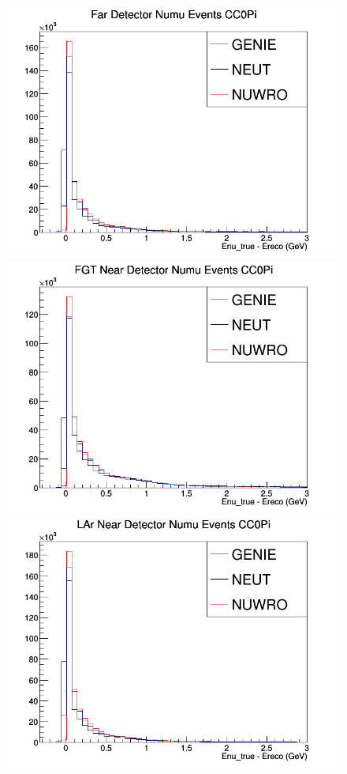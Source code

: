 \documentclass[12pt]{article}
\begin{document}
\begin{figure}[h]
\endminipage
\newline
{}
\includegraphics[width=\linewidth]{Ereco_Etrue/numu_FD_CC0Pi.png}
\endminipage
{}
\includegraphics[width=\linewidth]{Ereco_Etrue/numu_FGT_CC0Pi.png}
\endminipage
{}
\includegraphics[width=\linewidth]{Ereco_Etrue/numu_LAr_CC0Pi.png}

\end{figure}
\end{document}
